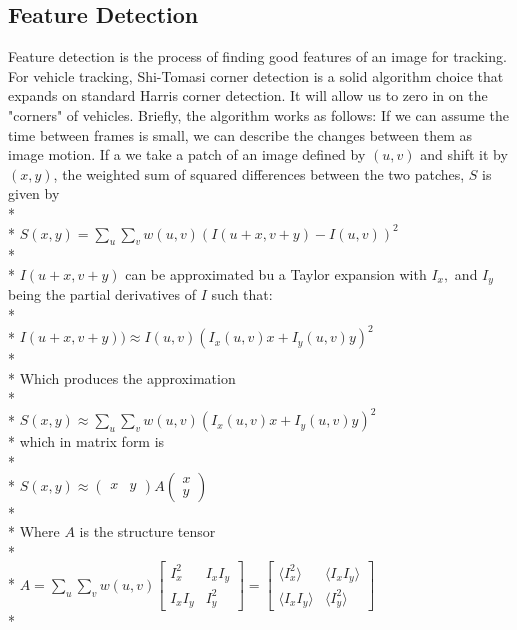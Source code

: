\documentclass{article} %
\begin{document}
\subsection{Feature Detection}
Feature detection is the process of finding good features of an image for tracking. For vehicle tracking, Shi-Tomasi corner detection is a solid algorithm choice that expands on standard Harris corner detection. It will allow us to zero in on the "corners" of vehicles. Briefly, the algorithm works as follows: If we can assume the time between frames is small, we can describe the changes between them as image motion. If a we take a patch of an image defined by $(u,v)$ and shift it by $(x,y)$, the weighted sum of squared differences between the two patches, $S$ is given by \\*
\\*
$ S(x,y) = \sum\limits_{u}\sum\limits_{v}w(u,v)(I(u+x, v+y) - I(u,v))^2$ \\*
\\*
$I(u+x,v+y)$ can be approximated bu a Taylor expansion with $I_x,$ and $I_y$ being the partial derivatives of $I$ such that:\\*
\\*
$I(u+x,v+y)) \approx I(u,v) (I_x(u,v) x+I_y(u,v) y)^2$\\*
\\*
Which produces the approximation\\*
\\*
$S(x,y) \approx \sum\limits_{u}\sum\limits_{v}w(u,v) (I_x(u,v) x+I_y(u,v) y)^2$\\*
which in matrix form is\\*
\\*
$S(x,y) \approx \left(\begin{smallmatrix}
x & y
\end{smallmatrix}\right) A
\left(\begin{smallmatrix}
x\\
y
\end{smallmatrix}\right)$\\*
\\*
Where $A$ is the structure tensor\\*
\\*
$
A = \sum_u \sum_v w(u,v) 
\begin{bmatrix}
I_x^2 & I_x I_y \\
I_x I_y & I_y^2 
\end{bmatrix}
=
\begin{bmatrix}
\langle I_x^2 \rangle & \langle I_x I_y \rangle\\
\langle I_x I_y \rangle & \langle I_y^2 \rangle
\end{bmatrix}$\\*
\end{document}
